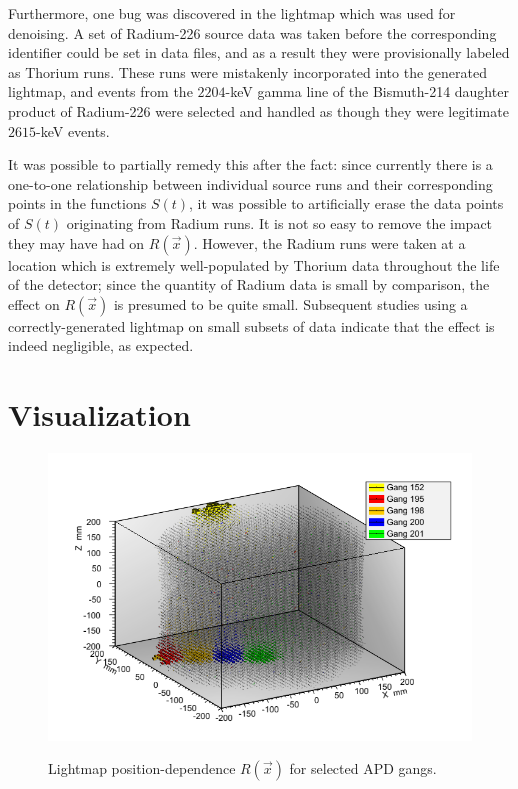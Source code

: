 Furthermore, one bug was discovered in the lightmap which was used for denoising.  A set of Radium-226 source data was taken before the corresponding identifier could be set in data files, and as a result they were provisionally labeled as Thorium runs.  These runs were mistakenly incorporated into the generated lightmap, and events from the $2204$-keV gamma line of the Bismuth-214 daughter product of Radium-226 were selected and handled as though they were legitimate $2615$-keV events.

It was possible to partially remedy this after the fact: since currently there is a one-to-one relationship between individual source runs and their corresponding points in the functions $S(t)$, it was possible to artificially erase the data points of $S(t)$ originating from Radium runs.  It is not so easy to remove the impact they may have had on $R(\vec{x})$.  However, the Radium runs were taken at a location which is extremely well-populated by Thorium data throughout the life of the detector; since the quantity of Radium data is small by comparison, the effect on $R(\vec{x})$ is presumed to be quite small.  Subsequent studies using a correctly-generated lightmap on small subsets of data indicate that the effect is indeed negligible, as expected.

\section{Visualization} \label{sec:LightmapVisualization}

\begin{figure}
\begin{center}
\includegraphics[keepaspectratio=true,width=\textwidth]{Lightmap_viz.png}
\end{center}
\renewcommand{\baselinestretch}{1}
\small\normalsize
\begin{quote}
\caption{Lightmap position-dependence $R(\vec{x})$ for selected APD gangs.}
\label{fig:Lightmap3DPlot_unzoomed}
\end{quote}
\end{figure}
\renewcommand{\baselinestretch}{2}
\small\normalsize

